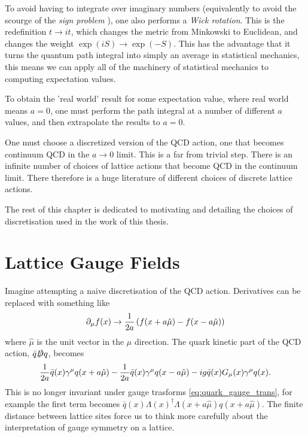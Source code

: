 To avoid having to integrate over imaginary numbers (equivalently to avoid the scourge of the {\it{sign problem}} \cite{deForcrand:2010ys}), one also performs a {\it{Wick rotation}}. This is the redefinition $t\to it$, which changes the metric from Minkowski to Euclidean, and changes the weight $\exp(iS) \to \exp(-S)$. This has the advantage that it turns the quantum path integral into simply an average in statistical mechanics, this means we can apply all of the machinery of statistical mechanics to computing expectation values.

To obtain the 'real world' result for some expectation value, where real world means $a=0$, one must perform the path integral at a number of different $a$ values, and then extrapolate the results to $a=0$.

One must choose a discretized version of the QCD action, one that becomes continuum QCD in the $a\to 0$ limit. This is a far from trivial step. There is an infinite number of choices of lattice actions that become QCD in the continuum limit. There therefore is a huge literature of different choices of discrete lattice actions.

The rest of this chapter is dedicated to motivating and detailing the choices of discretisation used in the work of this thesis.

\section{Lattice Gauge Fields}
\label{sec:gaugefields}

Imagine attempting a naive discretisation of the QCD action. Derivatives can be replaced with something like
\begin{align}
  \partial_{\mu}f(x) \to {1\over 2a} \left( f(x+a\hat{\mu}) - f(x-a\hat{\mu}) \right)
\end{align}
where $\hat{\mu}$ is the unit vector in the $\mu$ direction. The quark kinetic part of the QCD action, $\bar{q}\slashed{D}q$, becomes
\begin{align}
  {1\over 2a} \bar{q}(x)\gamma^{\mu}q(x+a\hat{\mu}) - {1\over 2a} \bar{q}(x)\gamma^{\mu}q(x-a\hat{\mu}) - ig\bar{q}(x)G_{\mu}(x)\gamma^{\mu} q(x).
\end{align}
This is no longer invariant under gauge trasforms \eqref{eq:quark_gauge_trans}, for example the first term becomes $\bar{q}(x)\Lambda(x)^{\dagger} \Lambda(x+a\hat{\mu}) q(x+a\hat{\mu})$. The finite distance between lattice sites force us to think more carefully about the interpretation of gauge symmetry on a lattice.

